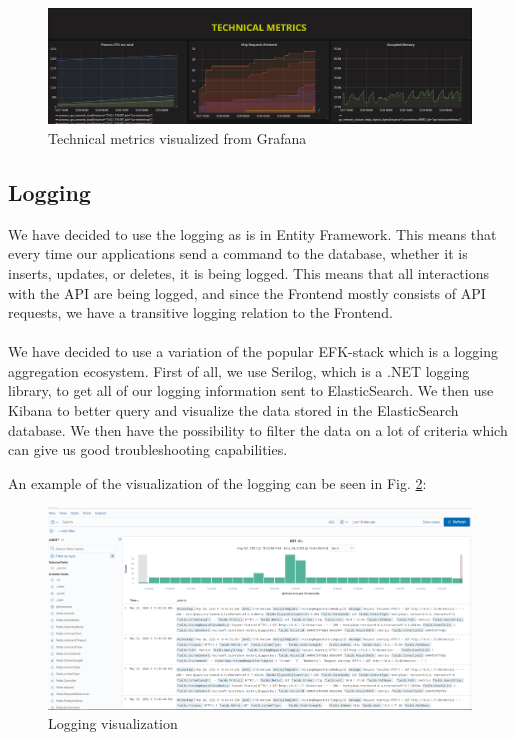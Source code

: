 \documentclass[10pt]{article}
\begin{document}
\begin{figure}[h]
    \centering
    \includegraphics[width=\textwidth]{images/monitoring technical.PNG}
    \caption{Technical metrics visualized from Grafana}
    \label{fig:monitoringtechnical}
\end{figure}

\subsection{Logging}
We have decided to use the logging as is in Entity Framework. This means that every time our applications send a command to the database, whether it is inserts, updates, or deletes, it is being logged. This means that all interactions with the API are being logged, and since the Frontend mostly consists of API requests, we have a transitive logging relation to the Frontend.    
\\
\\
We have decided to use a variation of the popular EFK-stack which is a logging aggregation ecosystem. First of all, we use Serilog, which is a .NET logging library, to get all of our logging information sent to ElasticSearch. We then use Kibana to better query and visualize the data stored in the ElasticSearch database. We then have the possibility to filter the data on a lot of criteria which can give us good troubleshooting capabilities.

An example of the visualization of the logging can be seen in Fig. \ref{fig:logging_visualization}:
\begin{figure}[H]
    \centering
    \includegraphics[width=\textwidth]{images/loggingvisualization.PNG}
    \caption{Logging visualization}
    \label{fig:logging_visualization}
\end{figure}
\end{document}
